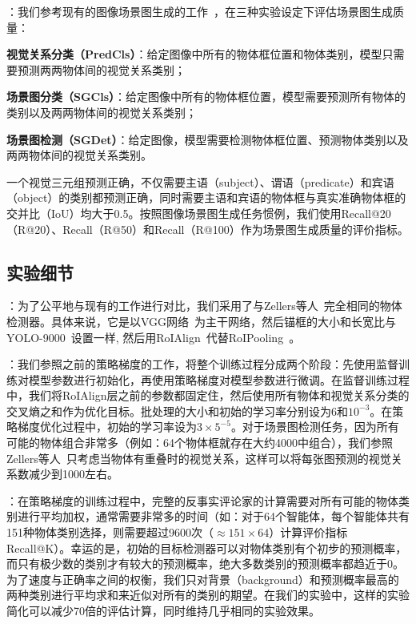 \textbf{}：我们参考现有的图像场景图生成的工作~\cite{xu2017scene, zellers2018neural, jae2018tensorize}，在三种实验设定下评估场景图生成质量：
\begin{asparaenum}
\item \textbf{视觉关系分类（PredCls）}：给定图像中所有的物体框位置和物体类别，模型只需要预测两两物体间的视觉关系类别；

\item \textbf{场景图分类（SGCls）}：给定图像中所有的物体框位置，模型需要预测所有物体的类别以及两两物体间的视觉关系类别；

\item \textbf{场景图检测（SGDet）}：给定图像，模型需要检测物体框位置、预测物体类别以及两两物体间的视觉关系类别。
\end{asparaenum}

一个视觉三元组预测正确，不仅需要主语（subject）、谓语（predicate）和宾语（object）的类别都预测正确，同时需要主语和宾语的物体框与真实准确物体框的交并比（IoU）均大于0.5。按照图像场景图生成任务惯例，我们使用Recall@20（R@20）、Recall（R@50）和Recall（R@100）作为场景图生成质量的评价指标。

\subsection{实验细节}

\textbf{}：为了公平地与现有的工作进行对比，我们采用了与Zellers等人~\cite{zellers2018neural}完全相同的物体检测器。具体来说，它是以VGG网络~\cite{simonyan2015very}为主干网络，然后锚框的大小和长宽比与YOLO-9000~\cite{redmon2017yolo9000}设置一样, 然后用RoIAlign~\cite{he2017mask}代替RoIPooling~\cite{girshick2014rich,girshick2015fast}。

\textbf{}：我们参照之前的策略梯度的工作，将整个训练过程分成两个阶段：先使用监督训练对模型参数进行初始化，再使用策略梯度对模型参数进行微调。在监督训练过程中，我们将RoIAlign层之前的参数都固定住，然后使用所有物体和视觉关系分类的交叉熵之和作为优化目标。批处理的大小和初始的学习率分别设为6和$10^{-3}$。在策略梯度优化过程中，初始的学习率设为$3\times5^{-5}$。对于场景图检测任务，因为所有可能的物体组合非常多（例如：64个物体框就存在大约4000中组合），我们参照Zellers等人~\cite{zellers2018neural}只考虑当物体有重叠时的视觉关系，这样可以将每张图预测的视觉关系数减少到1000左右。

\textbf{}：在策略梯度的训练过程中，完整的反事实评论家的计算需要对所有可能的物体类别进行平均加权，通常需要非常多的时间（如：对于64个智能体，每个智能体共有151种物体类别选择，则需要超过9600次（$\approx 151 \times 64$）计算评价指标Recall@K）。幸运的是，初始的目标检测器可以对物体类别有个初步的预测概率，而只有极少数的类别才有较大的预测概率，绝大多数类别的预测概率都趋近于0。为了速度与正确率之间的权衡，我们只对背景（background）和预测概率最高的两种类别进行平均求和来近似对所有的类别的期望。在我们的实验中，这样的实验简化可以减少70倍的评估计算，同时维持几乎相同的实验效果。

